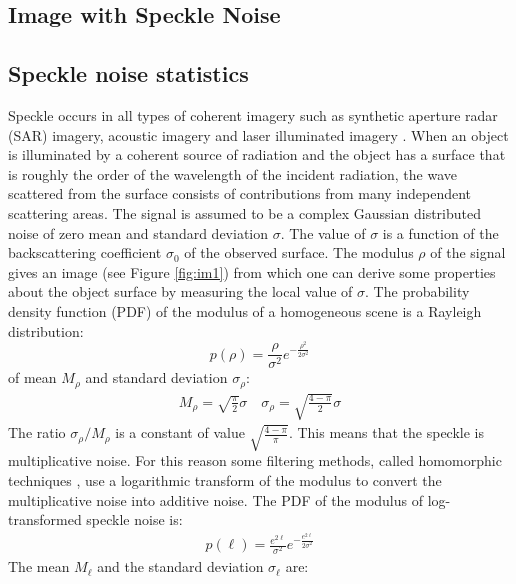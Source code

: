 \begin{itemize}
\clearpage


\section{Image with Speckle Noise}
\label{speckle}
\subsection{Speckle noise statistics}

Speckle occurs in all types of coherent imagery such as synthetic aperture radar (SAR) imagery, 
acoustic imagery and laser illuminated imagery \cite{rest:dainty75}. 
When an object is illuminated by a coherent source of radiation and the object
 has a surface that is roughly the order of the wavelength of the incident 
 radiation, the wave scattered from the surface consists of contributions 
 from many independent scattering areas. The signal is assumed to be a 
complex Gaussian distributed noise of zero mean and standard deviation
 $\sigma$. The value of $\sigma$ is a function of the backscattering 
coefficient $\sigma_0$ of the observed surface. The modulus $\rho$ of
 the signal gives  an image (see Figure \ref{fig:im1}) from which one 
 can derive some properties about the object surface by measuring the local 
 value of $\sigma$.
The probability density function (PDF) 
of the modulus of a homogeneous scene is a Rayleigh distribution:
\begin{equation}
p(\rho)=\frac{\rho}{\sigma^2}e^{-\frac{\rho^2}{ 2\sigma^2}}
\label{eq:2-9}
\end{equation}
of mean $M_{\rho}$ and standard deviation $\sigma_{\rho}$:
\begin{eqnarray}
M_{\rho} = \sqrt{ \frac{\pi}{2} } \sigma \quad \sigma_{\rho}=\sqrt 
{\frac{4-\pi}{2}}\sigma
\end{eqnarray}
The ratio $\sigma_{\rho}/M_{\rho}$ is a constant of 
value $\sqrt{\frac{4-\pi}{\pi}}$.
This means that the speckle is multiplicative noise. 
For this reason some filtering methods, 
called homomorphic techniques \cite{rest:frances95}, use a logarithmic 
transform of the modulus to convert the multiplicative noise into additive 
noise.  The PDF of the  modulus of log-transformed speckle noise is:
\begin{eqnarray}
p(\ell) =  \frac{e^{2\ell}}{ \sigma^2} e^{-\frac{e^{2\ell}}{2 \sigma^2} }
\label{eq:2-22}
\end{eqnarray}
The mean $M_{\ell}$ and the standard deviation $\sigma_{\ell}$ are:
\begin{eqnarray}

\end{eqnarray}
\end{itemize}
